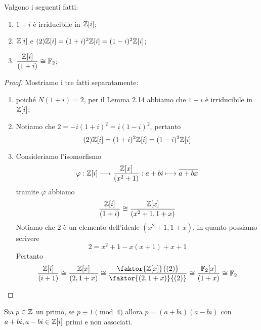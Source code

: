 \documentclass[11pt]{scrartcl}
\begin{document}
\begin{lemma}
    \label{lemma2.15}
    Valgono i seguenti fatti:
    \begin{enumerate}[(1)]
        \item $1 + i$ è irriducibile in $\mathbb Z[i]$;
        \item $\mathbb Z[i]$ e $(2)\mathbb Z[i] = (1 + i)^2\mathbb Z[i] = (1 - i)^2\mathbb Z[i]$;
        \item $\displaystyle\frac{\mathbb Z[i]}{(1 + i)}\cong \mathbb F_2$;
    \end{enumerate}
\end{lemma}

\begin{proof}Mostriamo i tre fatti separatamente:
    \begin{enumerate}[(1)]
        \item poiché $N(1 + i) = 2$, per il \hyperref[lemma2.14]{Lemma 2.14} abbiamo 
        che $1 + i$ è irriducibile in $\mathbb Z[i]$;
        \item Notiamo che $2 = -i(1 + i)^2 = i(1 - i)^2$, pertanto 
        \[
        (2)\mathbb Z[i] = (1 + i)^2\mathbb Z[i] = (1 - i)^2\mathbb Z[i]
        \]
        \item Consideriamo l'isomorfismo 
        \[
            \varphi: \mathbb Z[i]\longrightarrow \frac{\mathbb Z[x]}{(x^2 + 1)}:
            a + bi \longmapsto \overline{a + bx}
        \]
        tramite $\varphi$ abbiamo
        \[
            \frac{\mathbb Z[i]}{(1 + i)} \cong \frac{\mathbb Z[x]}{(x^2 + 1, 1 + x)}
        \]
        Notiamo che 2 è un elemento dell'ideale $(x^2 + 1, 1 + x)$, in quanto 
        possiamo scrivere
        \[
            2 = x^2 + 1 - x(x + 1) + x + 1
        \]
        Pertanto
        \[
            \frac{\ZZ[i]}{(i + 1)} \cong \frac{\ZZ[x]}{(2, 1 + x)} \cong 
            \frac{\faktor{\ZZ[x]}{(2)}}{\faktor{(2, 1 + x)}{(2)}} \cong 
            \frac{\FF_2[x]}{(1 + x)} \cong \FF_2
        \]
    \end{enumerate}
\end{proof}

\begin{lemma}
    \label{lemma2.16}
    Sia $p \in \mathbb Z$ un primo, se $p \equiv 1 \pmod 4$ allora $p = (a + bi)(a - bi)$
    con $a + bi, a - bi \in \mathbb Z[i]$ primi e non associati.
\end{lemma}
\end{document}
